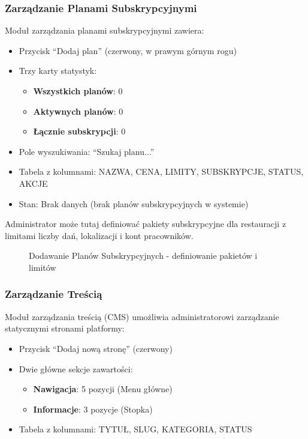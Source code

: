 \documentclass[12pt,a4paper,utf-8]{article}
\begin{document}
\subsubsection{Zarządzanie Planami Subskrypcyjnymi}

Moduł zarządzania planami subskrypcyjnymi zawiera:

\begin{itemize}
    \item Przycisk ``Dodaj plan'' (czerwony, w prawym górnym rogu)
    \item Trzy karty statystyk:
    \begin{itemize}
        \item \textbf{Wszystkich planów}: 0
        \item \textbf{Aktywnych planów}: 0
        \item \textbf{Łącznie subskrypcji}: 0
    \end{itemize}
    \item Pole wyszukiwania: ``Szukaj planu...''
    \item Tabela z kolumnami: NAZWA, CENA, LIMITY, SUBSKRYPCJE, STATUS, AKCJE
    \item Stan: Brak danych (brak planów subskrypcyjnych w systemie)
\end{itemize}

Administrator może tutaj definiować pakiety subskrypcyjne dla restauracji z limitami liczby dań, lokalizacji i kont pracowników.

\begin{figure}[H]
    \centering
    \caption{Dodawanie Planów Subskrypcyjnych  -  definiowanie pakietów i limitów}
    \label{fig:subscriptions}
\end{figure}

\subsubsection{Zarządzanie Treścią}

Moduł zarządzania treścią (CMS) umożliwia administratorowi zarządzanie statycznymi stronami platformy:

\begin{itemize}
    \item Przycisk ``Dodaj nową stronę'' (czerwony)
    \item Dwie główne sekcje zawartości:
    \begin{itemize}
        \item \textbf{Nawigacja}: 5 pozycji (Menu główne)
        \item \textbf{Informacje}: 3 pozycje (Stopka)
    \end{itemize}
    \item Tabela z kolumnami: TYTUŁ, SLUG, KATEGORIA, STATUS
\end{itemize}
\end{document}
